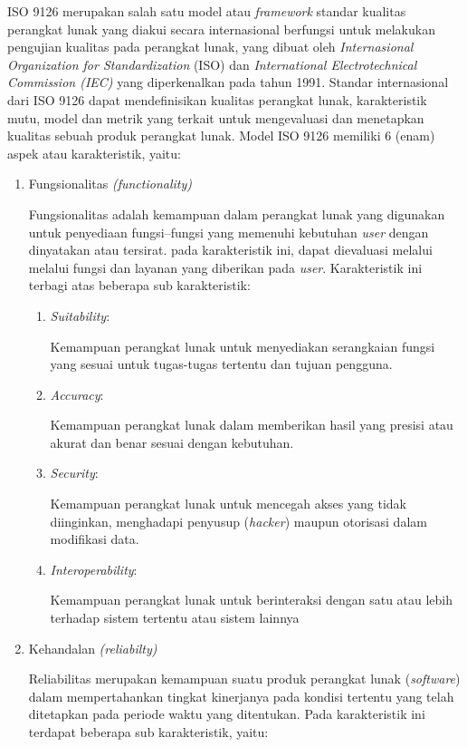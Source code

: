 ISO 9126 merupakan salah satu model atau \textit{framework} standar kualitas perangkat lunak yang diakui secara internasional berfungsi untuk melakukan pengujian kualitas pada perangkat lunak, yang dibuat oleh \textit{Internasional Organization for Standardization} (ISO) dan \textit{International Electrotechnical Commission (IEC)} yang diperkenalkan pada tahun 1991. Standar internasional dari ISO 9126 dapat mendefinisikan kualitas perangkat lunak, karakteristik mutu, model dan metrik yang terkait untuk mengevaluasi dan menetapkan kualitas sebuah produk perangkat lunak. Model ISO 9126 memiliki 6 (enam) aspek atau karakteristik, yaitu:  

\begin{enumerate}
	\item Fungsionalitas \textit{(functionality)}
	
	Fungsionalitas adalah kemampuan dalam perangkat lunak yang digunakan untuk penyediaan fungsi–fungsi yang memenuhi kebutuhan \textit{user} dengan dinyatakan atau tersirat. pada karakteristik ini, dapat dievaluasi melalui melalui fungsi dan layanan yang diberikan pada \textit{user}. Karakteristik ini terbagi atas beberapa sub karakteristik:

	\begin{enumerate}[label=\alph*)]
    \item \textit{Suitability}:
    
		Kemampuan perangkat lunak untuk menyediakan serangkaian fungsi yang sesuai untuk tugas-tugas tertentu dan tujuan pengguna.
    \item \textit{Accuracy}:
    
    Kemampuan perangkat lunak dalam memberikan hasil yang presisi atau akurat dan benar sesuai dengan kebutuhan.
    \item \textit{Security}:
    
		Kemampuan perangkat lunak untuk mencegah akses yang tidak
		diinginkan, menghadapi penyusup (\textit{hacker}) maupun otorisasi dalam modifikasi
		data. 
    \item \textit{Interoperability}:
    
    Kemampuan perangkat lunak untuk berinteraksi dengan satu atau lebih
		terhadap sistem tertentu atau sistem lainnya
	\end{enumerate}

	\item Kehandalan \textit{(reliabilty)}
	
	Reliabilitas merupakan kemampuan suatu produk perangkat lunak (\textit{software}) dalam mempertahankan tingkat kinerjanya pada kondisi tertentu yang telah ditetapkan pada periode waktu yang ditentukan. Pada karakteristik ini terdapat beberapa sub karakteristik, yaitu:


\end{enumerate}
